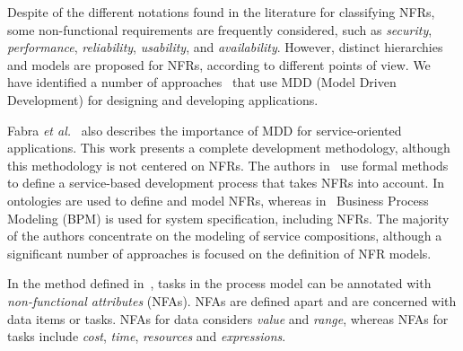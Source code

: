\documentclass{sig-alternate}
\begin{document}

Despite of the different notations found in the literature for classifying NFRs, some non-functional requirements are frequently considered, such as \textit{security}, \textit{performance}, \textit{reliability}, \textit{usability}, and \textit{availability}.
However, distinct hierarchies and models are proposed for NFRs,  according to different points of view.
We have identified a number of approaches~\cite{DAmbrogio06,CholletL09,SchmelingCM11,BasinDL06,Fabra2011,OvaskaEHPA10} that use MDD (Model Driven Development) for designing and developing applications. 




Fabra \textit{et al.}~\cite{Fabra2011} also describes the importance of  MDD for service-oriented applications. This work  presents a complete development methodology, although this methodology is not centered on NFRs.
The authors in~\cite{ThissenW06,ZhangPSP05} use formal methods to define a service-based development process that takes NFRs into account. 
In~\cite{AgarwalLS09,PastranaPK11} ontologies are used to define and model NFRs, 
whereas in~\cite{XiaoCZBOLH08,GutierrezRF10} Business Process Modeling (BPM) is used for
system specification, including NFRs. 
The majority of the authors concentrate on the  modeling of service compositions, although a significant number of approaches is focused on the definition of NFR models.


In the method defined in~\cite{XiaoCZBOLH08}, tasks in the process model can be 
annotated with \textit{non-functional attributes} (NFAs). 
NFAs are defined apart  and are concerned with data items or tasks. 
NFAs for data considers \textit{value} and \textit{range}, whereas NFAs for tasks include \textit{cost}, \textit{time}, \textit{resources} and \textit{expressions}.
\end{document}
